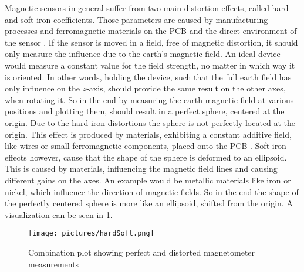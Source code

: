 Magnetic sensors in general suffer from two main distortion effects, called hard and soft-iron coefficients. Those parameters are caused by manufacturing processes and ferromagnetic materials on the \ac{PCB} and the direct environment of the sensor \cite{ozyagcilar2012calibrating}. If the sensor is moved in a field, free of magnetic distortion, it should only measure the influence due to the earth's magnetic field. An ideal device would measure a constant value for the field strength, no matter in which way it is oriented. In other words, holding the device, such that the full earth field has only influence on the $ z $-axis, should provide the same result on the other axes, when rotating it. So in the end by measuring the earth magnetic field at various positions and plotting them, should result in a perfect sphere, centered at the origin. Due to the hard iron distortions the sphere is not perfectly located at the origin. This effect is produced by materials, exhibiting a constant additive field, like wires or small ferromagnetic components, placed onto the PCB . Soft iron effects however, cause that the shape of the sphere is deformed to an ellipsoid. This is caused by materials, influencing the magnetic field lines and causing different gains on the axes. An example would be metallic materials like iron or nickel, which influence the direction of magnetic fields. So in the end the shape of the perfectly centered sphere is more like an ellipsoid, shifted from the origin. A visualization can be seen in \ref{fig:hardSoft}.

\begin{figure}
\centering
\texttt{[image: pictures/hardSoft.png]}
\caption{Combination plot showing perfect and distorted magnetometer measurements \cite{ozyagcilar2012calibrating}}
\label{fig:hardSoft}
\end{figure}

